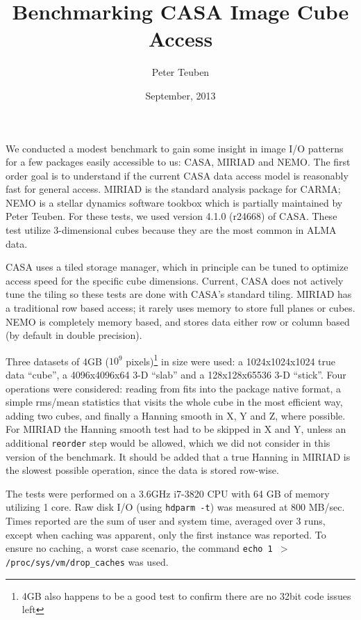 \documentclass{article}
\title{Benchmarking CASA Image Cube Access}
\author{Peter Teuben}
\date{September, 2013}
\begin{document}
\maketitle


We conducted a modest benchmark to gain some insight in image
I/O patterns for a few packages easily accessible to us: CASA,
MIRIAD and NEMO. The first order goal is to understand if the
current CASA data access model is reasonably fast for general
access.
MIRIAD is the standard analysis package for
CARMA; NEMO is a stellar dynamics software tookbox which is
partially maintained by Peter Teuben. For these tests, we
used version 4.1.0 (r24668) of CASA. These test utilize 3-dimensional cubes
because they are the most common in ALMA data.

CASA uses a tiled storage manager, which in principle
can be tuned to optimize access speed for the specific
cube dimensions.  Current, CASA does not actively tune
the tiling so these tests are done with CASA's standard tiling.
MIRIAD has a traditional row based access; it rarely
uses memory to store full planes or cubes. NEMO is completely
memory based, and stores data either row or column based
(by default in double precision).

Three datasets of 4GB ($10^9$ pixels)\footnote{4GB also happens to
be a good test to confirm there are no 32bit code issues left}
in size were used:
a 1024x1024x1024 true data ``cube'',
a 4096x4096x64 3-D ``slab'' and a 128x128x65536 3-D ``stick''.
Four operations were considered:  reading from fits
into the package native format,
a simple rms/mean statistics that visits the whole cube in the
most efficient way, adding two cubes, and finally
a Hanning smooth in X, Y and Z, where possible.  For MIRIAD
the Hanning smooth test had to be skipped in X and Y, unless
an additional {\tt reorder} step would be allowed, which we did
not consider in this version of the benchmark.
It should be added that a true Hanning in MIRIAD
is the slowest possible operation, since the data is stored
row-wise.

The tests were performed on a 3.6GHz i7-3820 CPU with 64 GB of memory 
utilizing 1 core.  Raw disk I/O (using {\tt hdparm -t}) was measured at
800 MB/sec. Times reported are the sum of user and system time, averaged
over 3 runs, except when caching was apparent, only the first instance 
was reported. To ensure no caching, a worst case scenario, the command
{\tt echo 1 $>$ /proc/sys/vm/drop\_caches} was used.
\end{document}
